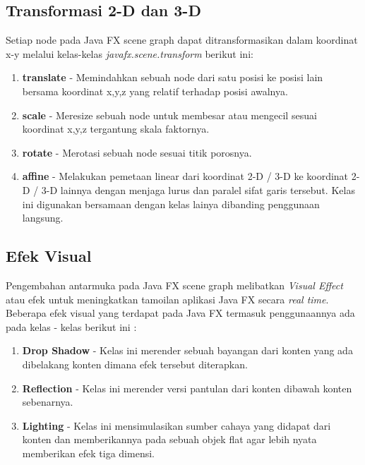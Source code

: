 \subsection{Transformasi 2-D dan 3-D}
\label{subs:Layout}
Setiap node pada Java FX scene graph dapat ditransformasikan dalam koordinat x-y melalui kelas-kelas \textit{javafx.scene.transform} berikut ini:\cite{javafx}
\begin{enumerate}
	\item \textbf{translate} - Memindahkan sebuah node dari satu posisi ke posisi lain bersama koordinat x,y,z yang relatif terhadap posisi awalnya.
	\item \textbf{scale} - Meresize sebuah node untuk membesar atau mengecil sesuai koordinat x,y,z tergantung skala faktornya.
	\item \textbf{rotate} - Merotasi sebuah node sesuai titik porosnya.
	\item \textbf{affine} - Melakukan pemetaan linear dari koordinat 2-D / 3-D ke koordinat 2-D / 3-D lainnya dengan menjaga lurus dan paralel sifat garis tersebut. Kelas ini digunakan bersamaan dengan kelas lainya dibanding penggunaan langsung.
\end{enumerate}

\subsection{Efek Visual}
\label{subs:Efek_Visual}
Pengembahan antarmuka pada Java FX scene graph melibatkan \textit{Visual Effect} atau efek untuk meningkatkan tamoilan aplikasi Java FX secara \textit{real time}. Beberapa efek visual yang terdapat pada Java FX termasuk penggunaannya ada pada kelas - kelas berikut ini :\cite{javafx}
\begin{enumerate}
	\item \textbf{Drop Shadow} - Kelas ini merender sebuah bayangan dari konten yang ada dibelakang konten dimana efek tersebut diterapkan.
	\item \textbf{Reflection} - Kelas ini merender versi pantulan dari konten dibawah konten sebenarnya.
	\item \textbf{Lighting} - Kelas ini mensimulasikan sumber cahaya yang didapat dari konten dan memberikannya pada sebuah objek flat agar lebih nyata memberikan efek tiga dimensi.
\end{enumerate}

